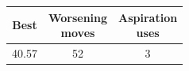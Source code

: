 \begin{tabular}{ccc}
\toprule
Best & \makecell{Worsening\\moves} & \makecell{Aspiration\\uses} \\
\midrule
40.57 & 52 & 3 \\
\bottomrule
\end{tabular}
